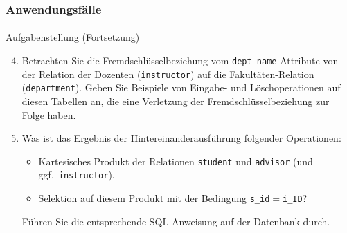 \begin{frame}[t]
\frametitle{Anwendungsf\"alle}
\framesubtitle{\insertsubsection}
\begin{alertblock}{Aufgabenstellung (Fortsetzung)}
\begin{enumerate}
 \setcounter{enumi}{3}	
 \item Betrachten Sie die Fremdschl\"usselbeziehung vom \texttt{dept\_name}-Attribute von der Relation der Dozenten 
  (\texttt{instructor}) auf die Fakult\"aten-Relation (\texttt{department}). Geben Sie Beispiele von Eingabe- 
  und L\"oschoperationen auf diesen Tabellen an, die eine Verletzung der Fremdschl\"usselbeziehung zur Folge haben.
 \item\label{first} Was ist das Ergebnis der Hintereinanderausf\"uhrung folgender Operationen: 
  \begin{itemize} 
	 \item Kartesisches Produkt der Relationen \texttt{student} und \texttt{advisor} (und ggf.~\texttt{instructor}).
	 \item Selektion auf diesem Produkt mit der Bedingung \texttt{s\_id}$=$\texttt{i\_ID}? 
  \end{itemize}
  F\"uhren Sie die entsprechende SQL-Anweisung auf der Datenbank durch.
\end{enumerate}
\end{alertblock}
\end{frame}

